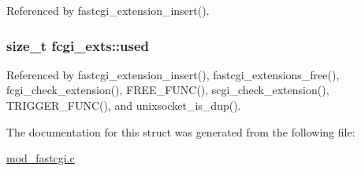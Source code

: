 Referenced by fastcgi\-\_\-extension\-\_\-insert().

\hypertarget{structfcgi__exts_a36b2a60d90e6c06887577925e8e839f4}{
\subsubsection[{used}]{\setlength{\rightskip}{0pt plus 5cm}size\-\_\-t fcgi\-\_\-exts\-::used}}\label{structfcgi__exts_a36b2a60d90e6c06887577925e8e839f4}


Referenced by fastcgi\-\_\-extension\-\_\-insert(), fastcgi\-\_\-extensions\-\_\-free(), fcgi\-\_\-check\-\_\-extension(), F\-R\-E\-E\-\_\-\-F\-U\-N\-C(), scgi\-\_\-check\-\_\-extension(), T\-R\-I\-G\-G\-E\-R\-\_\-\-F\-U\-N\-C(), and unixsocket\-\_\-is\-\_\-dup().



The documentation for this struct was generated from the following file\-:\begin{DoxyCompactItemize}
\item 
\hyperlink{mod__fastcgi_8c}{mod\-\_\-fastcgi.\-c}\end{DoxyCompactItemize}

